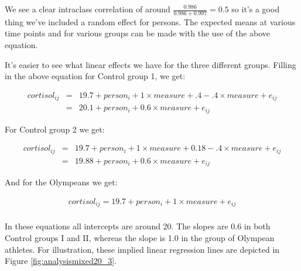 \documentclass[]{book}\usepackage[]{graphicx}\usepackage[]{color}
\begin{document}
We see a clear intraclass correlation of around $\frac{0.986}{0.986+0.997}= 0.5 $ so it's a good thing we've included a random effect for persons. The expected means at various time points and for various groups can be made with the use of the above equation. 

It's easier to see what linear effects we have for the three different groups. Filling in the above equation for Control group 1, we get:

\begin{eqnarray}
cortisol_{ij} &=& 19.7 + person_i + 1 \times measure + .4    -.4  \times measure +   e_{ij} \nonumber \\
               &=&  20.1 + person_i +0.6 \times measure +   e_{ij} \nonumber
\end{eqnarray}

For Control group 2 we get:

\begin{eqnarray}
cortisol_{ij} &=& 19.7 + person_i + 1 \times measure  + 0.18  - .4  \times measure+   e_{ij} \nonumber \\
        &=&   19.88 + person_i   + 0.6 \times measure    +   e_{ij}    \nonumber
\end{eqnarray}

And for the Olympeans we get:

\begin{eqnarray}
cortisol_{ij} = 19.7 + person_i + 1 \times measure  +   e_{ij} \nonumber \\
\end{eqnarray}


In these equations all intercepts are around 20. The slopes are 0.6 in both Control groups I and II, whereas the slope is 1.0 in the group of Olympean athletes. For illustration, these implied linear regression lines are depicted in Figure \ref{fig:analysismixed20_3}. 
\end{document}
